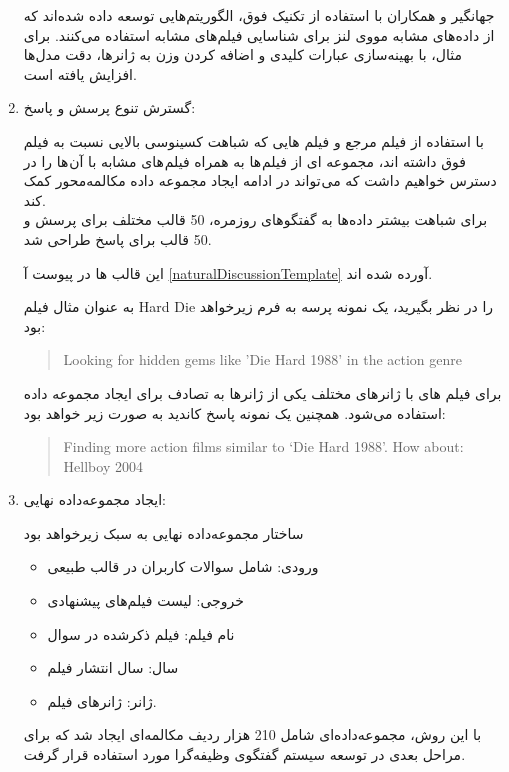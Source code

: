 \begin{enumerate}
جهانگیر و همکاران%
\cite{singh2020movie}
 با استفاده از تکنیک فوق، الگوریتم‌هایی توسعه داده شده‌اند که از داده‌های مشابه مووی لنز برای شناسایی فیلم‌های مشابه استفاده می‌کنند. برای مثال، با بهینه‌سازی عبارات کلیدی و اضافه کردن وزن به ژانرها، دقت مدل‌ها افزایش یافته است.


\item
گسترش تنوع پرسش و پاسخ:

با استفاده از فیلم مرجع و فیلم هایی که شباهت کسینوسی بالایی نسبت به فیلم فوق داشته اند، مجموعه ای از فیلم ها به همراه فیلم های مشابه با آن ها را در دسترس خواهیم داشت که می تواند در ادامه ایجاد مجموعه داده مکالمه‌محور کمک کند.\\
برای شباهت بیشتر داده‌ها به گفتگوهای روزمره، 50 قالب مختلف برای پرسش و 50 قالب برای پاسخ طراحی شد.

این قالب ها در پیوست آ%
\ref{naturalDiscussionTemplate}
 آورده شده اند.

به عنوان مثال فیلم Hard Die را در نظر بگیرید، یک نمونه پرسه به فرم زیرخواهد بود:
\begin{quote}
\begin{LTR}
Looking for hidden gems like 'Die Hard 1988' in the action genre
\end{LTR}
\end{quote}

برای فیلم های با ژانرهای مختلف یکی از ژانرها به تصادف برای ایجاد مجموعه داده استفاده می‌شود.
همچنین یک نمونه پاسخ کاندید به صورت زیر خواهد بود:
\begin{quote}
\begin{LTR}
Finding more action films similar to ‘Die Hard 1988'. How about: Hellboy 2004
\end{LTR}
\end{quote}


\item
ایجاد مجموعه‌داده نهایی: 

ساختار مجموعه‌داده نهایی به سبک زیرخواهد بود
\begin{itemize}
\item
ورودی: شامل سوالات کاربران در قالب طبیعی
\item
خروجی: لیست فیلم‌های پیشنهادی
\item
نام فیلم: فیلم ذکر‌شده در سوال
\item
سال: سال انتشار فیلم
\item
ژانر: ژانرهای فیلم.

\end{itemize}

با این روش، مجموعه‌داده‌ای شامل 210 هزار ردیف مکالمه‌ای ایجاد شد که برای مراحل بعدی در توسعه سیستم گفتگوی وظیفه‌گرا مورد استفاده قرار گرفت.


\end{enumerate}



